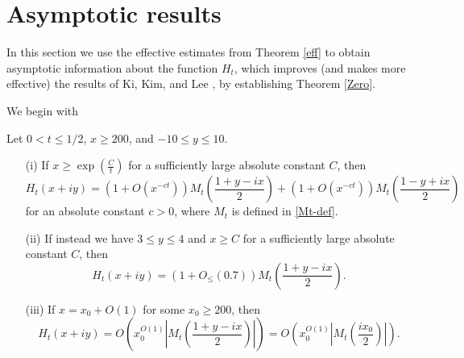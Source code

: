 \section{Asymptotic results}\label{asymptotic-sec}

In this section we use the effective estimates from Theorem \ref{eff} to obtain asymptotic information about the function $H_t$, which improves (and makes more effective) the results of Ki, Kim, and Lee \cite{kkl}, by establishing Theorem \ref{Zero}.

We begin with 

\begin{proposition}\label{asymp}  Let $0 < t \leq 1/2$, $x \geq 200$, and $-10 \leq y \leq 10$.
\begin{itemize}
\item[(i)]  If $x \geq \exp(\frac{C}{t})$ for a sufficiently large absolute constant $C$, then
$$ H_t(x+iy) = (1 + O(x^{-ct})) M_t\left(\frac{1+y-ix}{2}\right) + (1 + O(x^{-ct})) M_t\left(\frac{1-y+ix}{2} \right) $$
for an absolute constant $c>0$, where $M_t$ is defined in \eqref{Mt-def}.  
\item[(ii)]  If instead we have $3 \leq y \leq 4$ and $x \geq C$ for a sufficiently large absolute constant $C$, then
$$ H_t(x+iy) = (1 + O_{\leq}(0.7)) M_t\left(\frac{1+y-ix}{2}\right).$$
\item[(iii)]  If $x = x_0 + O(1)$ for some $x_0 \geq 200$, then
$$ H_t(x+iy) = O\left( x_0^{O(1)} \left|M_t\left(\frac{1+y-ix}{2}\right)\right| \right) = O\left( x_0^{O(1)} \left|M_t\left(\frac{ix_0}{2}\right)\right| \right).$$
\end{itemize}
\end{proposition}

